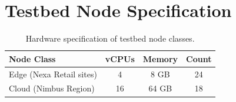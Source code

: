 \section{Testbed Node Specification}
\begin{table}[htb]
\centering
\caption{Hardware specification of testbed node classes.}
\renewcommand{\arraystretch}{1.25}
\begin{tabular}{lccc}
\toprule
\rowcolor{bitsnavy}
{\color{white}\textbf{Node Class}} & {\color{white}\textbf{vCPUs}} & {\color{white}\textbf{Memory}} & {\color{white}\textbf{Count}} \\
\midrule
Edge (Nexa Retail sites) & 4  & 8 GB  & 24 \\
Cloud (Nimbus Region)    & 16 & 64 GB & 18 \\
\bottomrule
\end{tabular}
\end{table}
